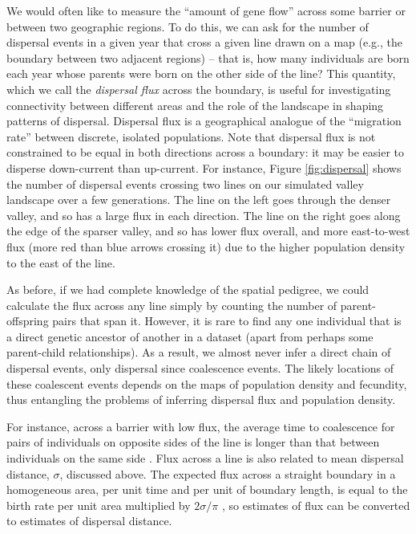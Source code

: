 \documentclass{ar-1col}
\renewcommand{\emph}[1]{{\textit{#1}}}
\begin{document}
We would often like to measure the ``amount of gene flow'' across some barrier
or between two geographic regions.
To do this,
we can ask for the number of dispersal events in a given year that cross 
a given line drawn on a map (e.g., the boundary between two adjacent regions)
-- that is, 
how many individuals are born each year whose parents
were born on the other side of the line?
This quantity, which we call the \emph{dispersal flux} across the boundary,
is useful for investigating connectivity between different areas
and the role of the landscape in shaping patterns of dispersal.
Dispersal flux is a geographical analogue of
the ``migration rate'' between discrete, isolated populations. 
Note that dispersal flux is not constrained to be equal in both directions across a boundary:
it may be easier to disperse down-current than up-current.
For instance, Figure \ref{fig:dispersal}
shows the number of dispersal events crossing two lines on our simulated valley landscape
over a few generations.
The line on the left goes through the denser valley, 
and so has a large flux in each direction.
The line on the right goes along the edge of the sparser valley,
and so has lower flux overall, and more east-to-west flux 
(more red than blue arrows crossing it)
due to the higher population density to the east of the line.

As before, if we had complete knowledge of the spatial pedigree,
we could calculate the flux across any line simply by counting the number of
parent-offspring pairs that span it.
However, it is rare to find any one individual
that is a direct genetic ancestor of another in a dataset
(apart from perhaps some parent-child relationships).
As a result, we almost never infer a direct chain of dispersal events,
only dispersal since coalescence events.
The likely locations of these coalescent events
depends on the maps of population density and fecundity,
thus entangling
the problems of inferring dispersal flux and population density.

For instance, across a barrier with low flux,
the average time to coalescence for pairs of individuals on opposite sides of the line
is longer than that between individuals on the same side \citep{bedassle,Duforet-Frebourg_Blum_2014,ringbauer2018estimating}.
Flux across a line is also related to mean dispersal distance, $\sigma$, discussed above.
The expected flux across a straight boundary in a homogeneous area,
per unit time and per unit of boundary length,
is equal to the birth rate per unit area multiplied by $2 \sigma / \pi$
\citep[where $\pi$ is the mathematical constant,][]{buffon1777},
so estimates of flux can be converted to estimates of dispersal distance.
\end{document}
